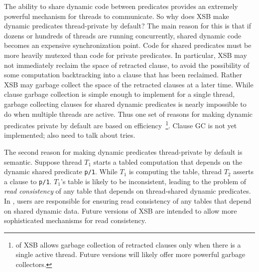 The ability to share dynamic code between predicates provides an
extremely powerful mechanism for threads to communicate.  So why does
XSB make dynamic predicates thread-private by default?  The main
reason for this is that if dozens or hundreds of threads are running
concurrently, shared dynamic code becomes an expensive synchronization
point.  Code for shared predicates must be more heavily mutexed than
code for private predicates.  In particular, XSB may not immediately
reclaim the space of retracted clause, to avoid the possibility of
some computation backtracking into a clause that has been reclaimed.
Rather XSB may garbage collect the space of the retracted clauses at a
later time.  While clause garbage collection is simple enough to
implement for a single thread, garbage collecting clauses for shared
dynamic predicates is nearly impossible to do when multiple threads
are active.  Thus one set of reasons for making dynamic predicates
private by default are based on efficiency~\footnote{\version{} of
  XSB allows garbage collection of retracted clauses only when there
  is a single active thread.  Future versions will likely offer more
  powerful garbage collectors.}.  {\sc Clause GC is not yet
  implemented; also need to talk about tries}.

The second reason for making dynamic predicates thread-private by
default is semantic.  Suppose thread $T_1$ starts a tabled computation
that depends on the dynamic shared predicate {\tt p/1}.  While $T_1$
is computing the table, thread $T_2$ asserts a clause to {\tt p/1}.
$T_1$'s table is likely to be inconsistent, leading to the problem of
{\em read consistency} of any table that depends on thread-shared
dynamic predicates.  In \version , users are responsible for ensuring
read consistency of any tables that depend on shared dynamic data.
Future versions of XSB are intended to allow more sophisticated
mechanisms for read consistency.

